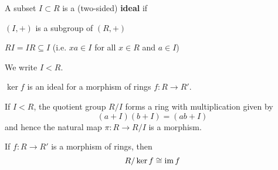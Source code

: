 \begin{defn}
	A subset $I \subset R$ is a (two-sided) \textbf{ideal} if
	\begin{enum}
		\item $(I,+)$ is a subgroup of $(R,+)$
		\item $RI = IR \subseteq I$ (i.e. $xa \in I$ for all $x \in R$ and $a \in I$)
	\end{enum}
	We write $I<R$.
\end{defn}

\begin{exam}
	$\ker f$ is an ideal for a morphism of rings $f: R \to R'$.
\end{exam}

\begin{exer}
  	\leavevmode
	\begin{itm}
		\item If $I<R$, the quotient group $R/I$ forms a ring with multiplication given by
		\[(a+I)(b+I)=(ab+I)\]
		and hence the natural map $\pi: R \to R/I$ is a morphism.
		\item If $f: R \to R'$ is a morphism of rings, then
		\[R/\ker f \cong \operatorname{im} f\]
	\end{itm}
\end{exer}

